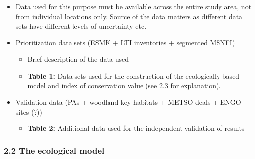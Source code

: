\documentclass[]{article}
\begin{document}
\begin{itemize}
\item
  Data used for this purpose must be available across the entire study
  area, not from individual locations only. Source of the data matters
  as different data sets have different levels of uncertainty etc.
\item
  Prioritization data sets (ESMK + LTI inventories + segmented MSNFI)

  \begin{itemize}
  \itemsep1pt\parskip0pt
  \item
    Brief description of the data used
  \item
    \textbf{Table 1:} Data sets used for the construction of the
    ecologically based model and index of conservation value (see 2.3
    for explanation).
  \end{itemize}
\item
  Validation data (PAs + woodland key-habitats + METSO-deals + ENGO
  sites (?))

  \begin{itemize}
  \itemsep1pt\parskip0pt
  \item
    \textbf{Table 2:} Additional data used for the independent
    validation of results
  \end{itemize}
\end{itemize}

\subsubsection{2.2 The ecological model}
\end{document}
